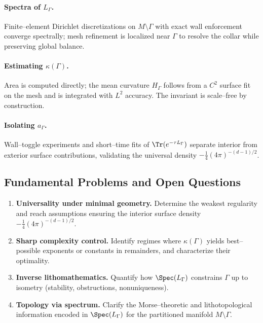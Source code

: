 \paragraph{Spectra of $L_\Gamma$.}
Finite–element Dirichlet discretizations on $M\setminus\Gamma$ with exact wall enforcement converge spectrally; mesh refinement is localized near $\Gamma$ to resolve the collar while preserving global balance.
\paragraph{Estimating $\kappa(\Gamma)$.}
Area is computed directly; the mean curvature $H_\Gamma$ follows from a $C^2$ surface fit on the mesh and is integrated with $L^2$ accuracy. The invariant is scale–free by construction.
\paragraph{Isolating $a_\Gamma$.}
Wall–toggle experiments and short–time fits of $\Tr(e^{-\tau L_\Gamma})$ separate interior from exterior surface contributions, validating the universal density $-\frac14(4\pi)^{-(d-1)/2}$.

\subsection{Fundamental Problems and Open Questions}\label{sec:open-questions}
\begin{enumerate}
  \item \textbf{Universality under minimal geometry.} Determine the weakest regularity and reach assumptions ensuring the interior surface density $-\tfrac14(4\pi)^{-(d-1)/2}$.
  \item \textbf{Sharp complexity control.} Identify regimes where $\kappa(\Gamma)$ yields best–possible exponents or constants in remainders, and characterize their optimality.
  \item \textbf{Inverse lithomathematics.} Quantify how $\Spec(L_\Gamma)$ constrains $\Gamma$ up to isometry (stability, obstructions, nonuniqueness).
  \item \textbf{Topology via spectrum.} Clarify the Morse–theoretic and lithotopological information encoded in $\Spec(L_\Gamma)$ for the partitioned manifold $M\setminus\Gamma$.
\end{enumerate}

